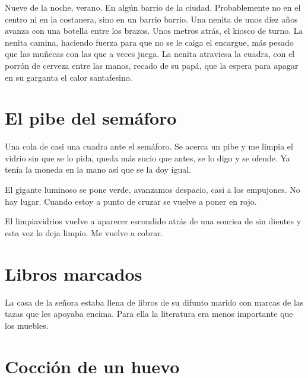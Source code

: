 \documentclass[11pt,twoside,openright,a6paper]{book}
\begin{document}
Nueve de la noche, verano. En algún barrio de la ciudad.
Probablemente no en el centro ni en la costanera, sino en un barrio barrio. 
Una nenita de unos diez años avanza con una botella entre los brazos. 
Unos metros atrás, el kiosco de turno. 
La nenita camina, haciendo fuerza para que no se le caiga el encargue, más pesado que las muñecas con las que a veces juega. 
La nenita atraviesa la cuadra, con el porrón de cerveza entre las manos, recado de su papá, que la espera para apagar en su garganta el calor santafesino.

\chapter*{El pibe del semáforo}

Una cola de casi una cuadra ante el semáforo. Se acerca un pibe y me limpia el vidrio sin que se lo pida, queda más sucio que antes, se lo digo y se ofende. Ya tenía la moneda en la mano así que se la doy igual.

El gigante luminoso se pone verde, avanzamos despacio, casi a los empujones. No hay lugar. Cuando estoy a punto de cruzar se vuelve a poner en rojo.

El limpiavidrios vuelve a aparecer escondido atrás de una sonrisa de sin dientes y esta vez lo deja limpio.
Me vuelve a cobrar.

\chapter*{Libros marcados}

La casa de la señora estaba llena de libros de su difunto marido con marcas de las tazas que les apoyaba encima. Para ella la literatura era menos importante que los muebles.

\chapter*{Cocción de un huevo}
\end{document}

